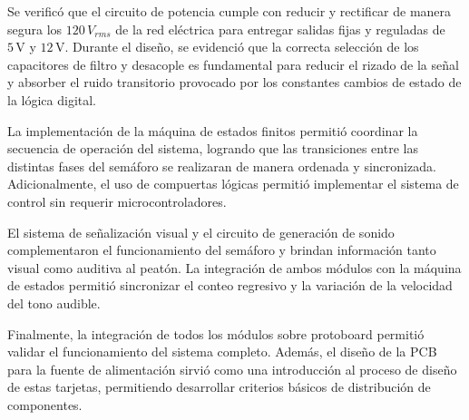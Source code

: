 \documentclass[12pt, journal, onecolumn]{IEEEtran}
\begin{document}
Se verificó que el circuito de potencia cumple con reducir y rectificar de manera segura los $120\,V_{rms}$ de la red eléctrica para entregar salidas fijas y reguladas de $5\,\mathrm{V}$ y $12\,\mathrm{V}$. Durante el diseño, se evidenció que la correcta selección de los capacitores de filtro y desacople es fundamental para reducir el rizado de la señal y absorber el ruido transitorio provocado por los constantes cambios de estado de la lógica digital.

La implementación de la máquina de estados finitos permitió coordinar la secuencia de operación del sistema, logrando que las transiciones entre las distintas fases del semáforo se realizaran de manera ordenada y sincronizada. Adicionalmente, el uso de compuertas lógicas permitió implementar el sistema de control sin requerir microcontroladores.

El sistema de señalización visual y el circuito de generación de sonido complementaron el funcionamiento del semáforo y brindan información tanto visual como auditiva al peatón. La integración de ambos módulos con la máquina de estados permitió sincronizar el conteo regresivo y la variación de la velocidad del tono audible.

Finalmente, la integración de todos los módulos sobre protoboard permitió validar el funcionamiento del sistema completo. Además, el diseño de la PCB para la fuente de alimentación sirvió como una introducción al proceso de diseño de estas tarjetas, permitiendo desarrollar criterios básicos de distribución de componentes.
\end{document}
